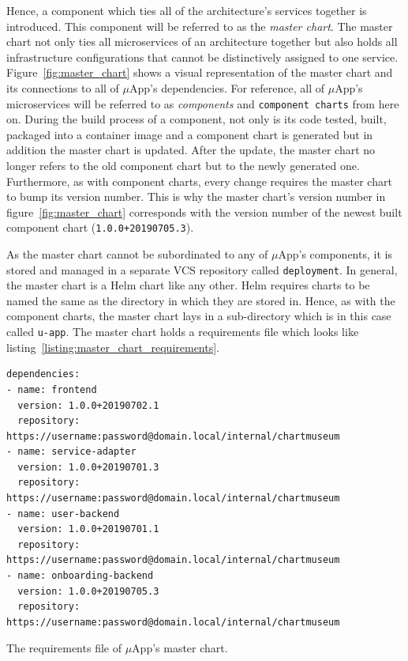 Hence, a component which ties all of the architecture's services together is
introduced. This component will be referred to as the \textit{master chart}.
The master chart not only ties all microservices of an architecture together
but also holds all infrastructure configurations that cannot be distinctively
assigned to one service. Figure~\ref{fig:master_chart} shows a visual
representation of the master chart and its connections to all of $\mu$App's
dependencies. For reference, all of $\mu$App's microservices will be referred
to as \textit{components} and \texttt{component charts} from here on. During
the build process of a component, not only is its code tested, built, packaged
into a container image and a component chart is generated but in addition the
master chart is updated. After the update, the master chart no longer refers to
the old component chart but to the newly generated one. Furthermore, as with
component charts, every change requires the master chart to bump its version
number. This is why the master chart's version number in
figure~\ref{fig:master_chart} corresponds with the version number of the newest
built component chart (\texttt{1.0.0+20190705.3}).

As the master chart cannot be subordinated to any of $\mu$App's components, it
is stored and managed in a separate \ac{VCS} repository called
\texttt{deployment}. In general, the master chart is a Helm chart like any
other. Helm requires charts to be named the same as the directory in which they
are stored in. Hence, as with the component charts, the master chart lays in a
sub-directory which is in this case called \texttt{u-app}. The master chart
holds a requirements file which looks like
listing~\ref{listing:master_chart_requirements}.

\begin{listing}[H]
  \begin{verbatim}
dependencies:
- name: frontend
  version: 1.0.0+20190702.1
  repository: https://username:password@domain.local/internal/chartmuseum
- name: service-adapter
  version: 1.0.0+20190701.3
  repository: https://username:password@domain.local/internal/chartmuseum
- name: user-backend
  version: 1.0.0+20190701.1
  repository: https://username:password@domain.local/internal/chartmuseum
- name: onboarding-backend
  version: 1.0.0+20190705.3
  repository: https://username:password@domain.local/internal/chartmuseum

  \end{verbatim}
  \caption{The requirements file of $\mu$App's master chart.}%
  \label{listing:master_chart_requirements}
\end{listing}

